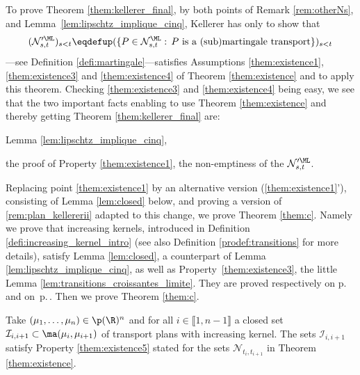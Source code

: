 \begin{rem}\label{rem:plan_kellerer}To prove Theorem \ref{them:kellerer_final}, by both points of Remark \ref{rem:otherNs},
and Lem\-ma~\ref{lem:lipschtz_implique_cinq}, Kellerer has only to show that
\[
(\mathcal{N}_{s,t}'^\ML)_{s<t}\eqdefup(\{P\in\mathcal{N}_{s,t}^\ML :\,P\text{ is a (sub)mar\-tin\-gale transport}\})_{s<t}
\]
---see Definition \ref{defi:martingale}---satisfies Assumptions \eqref{them:existence1}, \eqref{them:existence3} and \eqref{them:existence4} of Theorem \ref{them:existence} and to apply this theorem. Checking \eqref{them:existence3} and \eqref{them:existence4} being easy, we see that the two important facts enabling to use Theorem \ref{them:existence} and thereby getting Theorem \ref{them:kellerer_final} are:

\begin{enumeratei}
\item\label{rem:plan_kellereri}
Lemma \ref{lem:lipschtz_implique_cinq},

\item\label{rem:plan_kellererii}
the proof of Property \eqref{them:existence1}, \ie the non-emptiness of the $\mathcal{N}_{s,t}'^\ML$.
\end{enumeratei}
\end{rem}

Replacing point \eqref{them:existence1} by an alternative version (\ref{them:existence1}'), consisting of Lemma \ref{lem:closed} below, and proving a version of \eqref{rem:plan_kellererii} adapted to this change, we prove Theorem \ref{them:c}. Namely we prove that increasing kernels, introduced in Definition \ref{defi:increasing_kernel_intro} (see also Definition \ref{prodef:transitions} for more details), satisfy Lemma \ref{lem:closed}, a counterpart of Lemma \ref{lem:lipschtz_implique_cinq}, as well as Property~\eqref{them:existence3}, \ie the little Lemma \ref{lem:transitions_croissantes_limite}. They are proved respectively on p.\,\pageref{proof:lem:closed} and on~p.\,\pageref{proof:lem:transitions_croissantes_limite}. Then we prove Theorem \ref{them:c}.

\begin{lem}\label{lem:closed}Take $
(\mu_1,\ldots,\mu_n)\in\p(\R)^n$ and for all $i\in\llbracket1,n-1\rrbracket$ a closed set $\mathcal{I}_{i,i+1}\subset\ma(\mu_i,\mu_{i+1})$ of transport plans with increasing kernel. The sets $\mathcal{I}_{i,i+1}$ satisfy Property \eqref{them:existence5} stated for the sets $\mathcal{N}_{t_i,t_{i+1}}$ in Theorem \ref{them:existence}.
\end{lem}

